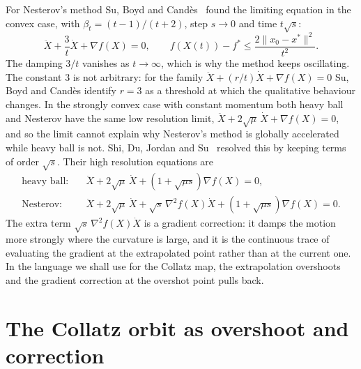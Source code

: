 For Nesterov's method Su, Boyd and Cand\`es~\cite{su2016} found the limiting
equation in the convex case, with $\beta_t=(t-1)/(t+2)$, step $s\to0$ and time
$t\sqrt s$:
\begin{equation}\label{eq:ch5:sbc}
  \ddot X+\frac3t\dot X+\nabla f(X)=0,\qquad
  f(X(t))-f^\ast\le\frac{2\|x_0-x^\ast\|^2}{t^2}.
\end{equation}
The damping $3/t$ vanishes as $t\to\infty$, which is why the method keeps
oscillating.  The constant $3$ is not arbitrary: for the family
$\ddot X+(r/t)\dot X+\nabla f(X)=0$ Su, Boyd and Cand\`es identify $r=3$ as a
threshold at which the qualitative behaviour changes.  In the strongly convex case with
constant momentum both heavy ball and Nesterov have the same low resolution
limit, $\ddot X+2\sqrt\mu\,\dot X+\nabla f(X)=0$, and so the limit cannot
explain why Nesterov's method is globally accelerated while heavy ball is not.
Shi, Du, Jordan and Su~\cite{shi2022} resolved this by keeping terms of order
$\sqrt s$.  Their high resolution equations are
\begin{align}
  \text{heavy ball:}\quad&\ddot X+2\sqrt\mu\,\dot X+(1+\sqrt{\mu s})\nabla f(X)=0,
  \label{eq:ch5:hrhb}\\
  \text{Nesterov:}\quad&\ddot X+2\sqrt\mu\,\dot X+\sqrt s\,\nabla^2 f(X)\dot X
  +(1+\sqrt{\mu s})\nabla f(X)=0 .
  \label{eq:ch5:hrnag}
\end{align}
The extra term $\sqrt s\,\nabla^2f(X)\dot X$ is a gradient correction: it
damps the motion more strongly where the curvature is large, and it is the
continuous trace of evaluating the gradient at the extrapolated point rather
than at the current one.  In the language we shall use for the Collatz map,
the extrapolation overshoots and the gradient correction at the overshot point
pulls back.

\section{The Collatz orbit as overshoot and correction}\label{sec:ch5:overshoot}

